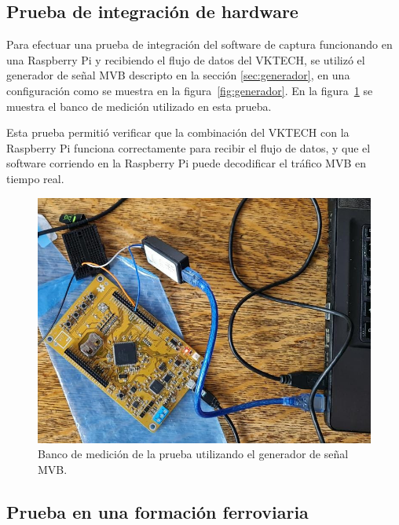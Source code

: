 \subsection{Prueba de integración de hardware}


Para efectuar una prueba de integración del software de captura funcionando en una Raspberry Pi y recibiendo el flujo de datos del VKTECH, se utilizó el generador de señal MVB descripto en la sección \ref{sec:generador}, en una configuración como se muestra en la figura~\ref{fig:generador}.
En la figura~\ref{fig:educiaa+vktech} se muestra el banco de medición utilizado en esta prueba.

Esta prueba permitió verificar que la combinación del VKTECH con la Raspberry Pi funciona correctamente para recibir el flujo de datos, y que el software corriendo en la Raspberry Pi puede decodificar el tráfico MVB en tiempo real.

\begin{figure}[htbp]
	\centering
	\includegraphics[width=\textwidth]{./Figures/educiaa+vktech.jpg}
	\caption{Banco de medición de la prueba utilizando el generador de señal MVB.}
    \label{fig:educiaa+vktech}
\end{figure}


\subsection{Prueba en una formación ferroviaria}



